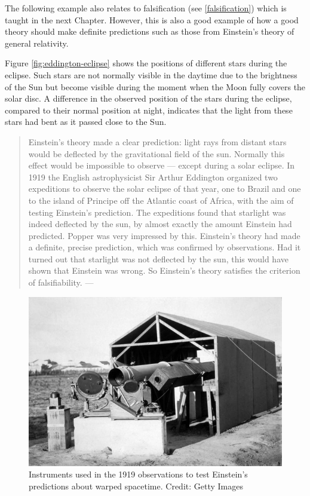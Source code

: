 \documentclass[
]{book}
\begin{document}
The following example also relates to falsification (see \ref{falsification}) which is taught in the next Chapter. However, this is also a good example of how a good theory should make definite predictions such as those from Einstein's theory of general relativity.

Figure \ref{fig:eddington-eclipse} shows the positions of different stars during the eclipse. Such stars are not normally visible in the daytime due to the brightness of the Sun but become visible during the moment when the Moon fully covers the solar disc. A difference in the observed position of the stars during the eclipse, compared to their normal position at night, indicates that the light from these stars had bent as it passed close to the Sun.



\begin{quote}
Einstein's theory made a clear prediction: light rays from distant stars would be deflected by the gravitational field of the sun. Normally this effect would be impossible to observe --- except during a solar eclipse. In 1919 the English astrophysicist Sir Arthur Eddington organized two expeditions to observe the solar eclipse of that year, one to Brazil and one to the island of Principe off the Atlantic coast of Africa, with the aim of testing Einstein's prediction. The expeditions found that starlight was indeed deflected by the sun, by almost exactly the amount Einstein had predicted. Popper was very impressed by this. Einstein's theory had made a definite, precise prediction, which was confirmed by observations. Had it turned out that starlight was not deflected by the sun, this would have shown that Einstein was wrong. So Einstein's theory satisfies the criterion of falsifiability. --- \citep{okasha-pos}
\end{quote}

\begin{figure}

{\centering \includegraphics[width=0.5\linewidth]{Figures/eddington-instruments} 

}

\caption{Instruments used in the 1919 observations to test Einstein's predictions about warped spacetime. Credit: Getty Images}\label{fig:eddington-instruments}
\end{figure}
\end{document}
